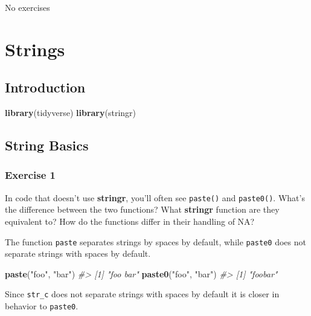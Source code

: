 \documentclass[]{book}
\newenvironment{Shaded}{\begin{snugshade}}{\end{snugshade}}
\newcommand{\CommentTok}[1]{\textcolor[rgb]{0.56,0.35,0.01}{\textit{#1}}}
\newcommand{\KeywordTok}[1]{\textcolor[rgb]{0.13,0.29,0.53}{\textbf{#1}}}
\newcommand{\NormalTok}[1]{#1}
\newcommand{\StringTok}[1]{\textcolor[rgb]{0.31,0.60,0.02}{#1}}
\theoremstyle{plain}
\theoremstyle{remark}
\theoremstyle{definition}
\theoremstyle{definition}
\theoremstyle{definition}
\theoremstyle{remark}
\begin{document}
No exercises

\hypertarget{strings}{%
\chapter{Strings}\label{strings}}

\hypertarget{introduction-9}{%
\section{Introduction}\label{introduction-9}}

\begin{Shaded}
\begin{Highlighting}[]
\KeywordTok{library}\NormalTok{(tidyverse)}
\KeywordTok{library}\NormalTok{(stringr)}
\end{Highlighting}
\end{Shaded}

\hypertarget{string-basics}{%
\section{String Basics}\label{string-basics}}

\hypertarget{exercise-1-30}{%
\subsection{Exercise 1}\label{exercise-1-30}}

In code that doesn't use \textbf{stringr}, you'll often see
\texttt{paste()} and \texttt{paste0()}. What's the difference between
the two functions? What \textbf{stringr} function are they equivalent
to? How do the functions differ in their handling of NA?

The function \texttt{paste} separates strings by spaces by default,
while \texttt{paste0} does not separate strings with spaces by default.

\begin{Shaded}
\begin{Highlighting}[]
\KeywordTok{paste}\NormalTok{(}\StringTok{"foo"}\NormalTok{, }\StringTok{"bar"}\NormalTok{)}
\CommentTok{#> [1] "foo bar"}
\KeywordTok{paste0}\NormalTok{(}\StringTok{"foo"}\NormalTok{, }\StringTok{"bar"}\NormalTok{)}
\CommentTok{#> [1] "foobar"}
\end{Highlighting}
\end{Shaded}

Since \texttt{str\_c} does not separate strings with spaces by default
it is closer in behavior to \texttt{paste0}.
\end{document}
